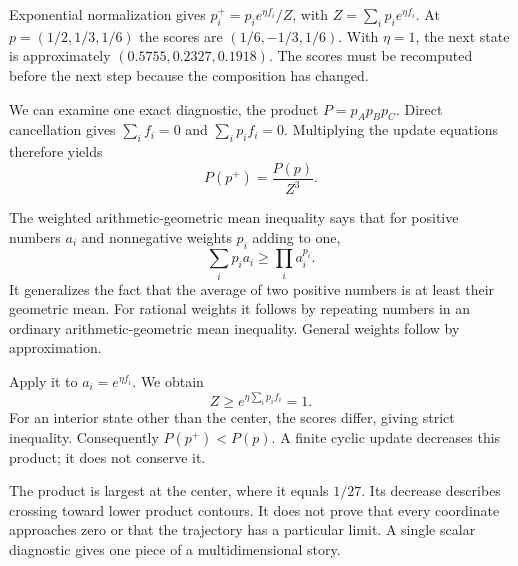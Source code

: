 \documentclass[11pt,oneside,openany]{book}
\theoremstyle{definition}
\theoremstyle{remark}
\numberwithin{equation}{chapter}
\begin{document}
Exponential normalization gives \(p_i^+=p_i e^{\eta f_i}/Z\), with \(Z=\sum_i p_i e^{\eta f_i}\). At \(p=(1/2,1/3,1/6)\) the scores are \((1/6,-1/3,1/6)\). With \(\eta=1\), the next state is approximately \((0.5755,0.2327,0.1918)\). The scores must be recomputed before the next step because the composition has changed.

We can examine one exact diagnostic, the product \(P=p_Ap_Bp_C\). Direct cancellation gives \(\sum_i f_i=0\) and \(\sum_i p_if_i=0\). Multiplying the update equations therefore yields \[P(p^+)=\frac{P(p)}{Z^3}.\]

The weighted arithmetic-geometric mean inequality says that for positive numbers \(a_i\) and nonnegative weights \(p_i\) adding to one, \[\sum_i p_i a_i\geq\prod_i a_i^{p_i}.\] It generalizes the fact that the average of two positive numbers is at least their geometric mean. For rational weights it follows by repeating numbers in an ordinary arithmetic-geometric mean inequality. General weights follow by approximation.

Apply it to \(a_i=e^{\eta f_i}\). We obtain \[Z\geq e^{\eta\sum_i p_if_i}=1.\] For an interior state other than the center, the scores differ, giving strict inequality. Consequently \(P(p^+)<P(p)\). A finite cyclic update decreases this product; it does not conserve it.

The product is largest at the center, where it equals \(1/27\). Its decrease describes crossing toward lower product contours. It does not prove that every coordinate approaches zero or that the trajectory has a particular limit. A single scalar diagnostic gives one piece of a multidimensional story.
\end{document}
